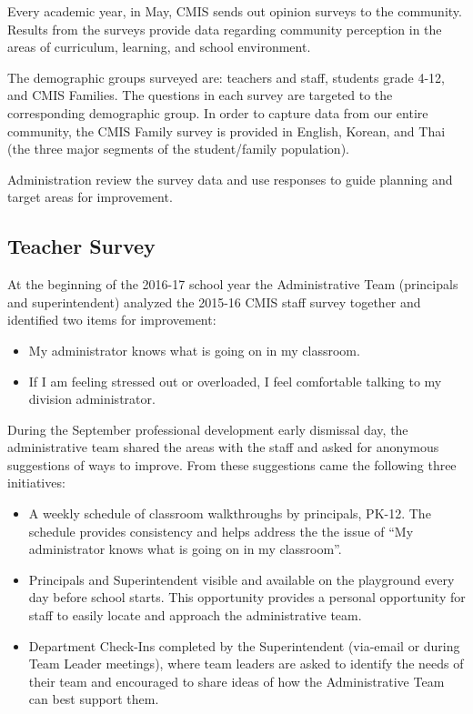 
Every academic year, in May, CMIS sends out opinion surveys to the community.  Results from the surveys provide data regarding community perception in the areas of curriculum, learning, and school environment. 

The demographic groups surveyed are: teachers and staff, students grade 4-12, and CMIS Families. The questions in each survey are targeted to the corresponding demographic group. In order to capture data from our entire community, the CMIS Family survey is provided in English, Korean, and Thai (the three major segments of the student/family population).

Administration review the survey data and use responses to guide planning and target areas for improvement.

\subsection{Teacher Survey}

At the beginning of the 2016-17 school year the Administrative Team (principals and superintendent) analyzed the 2015-16 CMIS staff survey together and identified two items for improvement:
\begin{itemize}
\item My administrator knows what is going on in my classroom.
\item If I am feeling stressed out or overloaded, I feel comfortable talking to my division administrator. 
\end{itemize}


During the September professional development early dismissal day, the administrative team shared the areas with the staff and asked for anonymous suggestions of ways to improve. From these suggestions came the following three initiatives:
\begin{itemize}
\item A weekly schedule of classroom walkthroughs by principals, PK-12.  The schedule provides consistency and helps address the the issue of “My administrator knows what is going on in my classroom”.
\item Principals and Superintendent visible and available on the playground every day before school starts.  This opportunity provides a personal opportunity for staff to easily locate and approach the administrative team.
\item Department Check-Ins completed by the Superintendent (via-email or during Team Leader meetings), where team leaders are asked to identify the needs of their team and encouraged to share ideas of how the Administrative Team can best support them.
\end{itemize}

